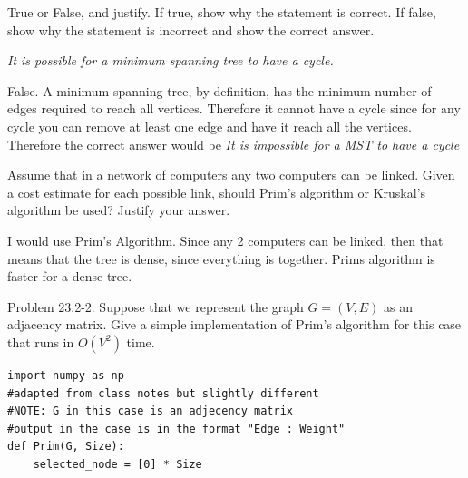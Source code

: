 \documentclass[addpoints,11pt]{exam}
\begin{document}
\begin{questions}
\ifprintanswers
\newpage
\else
\bigskip
\fi
	
	
\question[5]  True or False, and justify.  If true, show why the statement is correct.  If false, show why the statement is incorrect and show the correct answer.
\begin{center}
	\textit{It is possible for a minimum spanning tree to have a cycle.}
\end{center}
\begin{solutionorbox}
	False. A minimum spanning tree, by definition, has the minimum number of edges required to reach all vertices. Therefore it cannot have a cycle since for any cycle you can remove at least one edge and have it reach all the vertices. Therefore the correct answer would be \emph{It is impossible for a MST to have a cycle}
\end{solutionorbox}

\ifprintanswers
\newpage
\else
\bigskip
\fi


\question [5] Assume that in a network of computers any two computers can be linked.  Given a cost estimate for each possible link, should Prim's algorithm or Kruskal's algorithm be used?  Justify your answer.
\begin{solutionorbox}
    I would use Prim's Algorithm. Since any 2 computers can be linked, then that means that the tree is dense, since everything is together. Prims algorithm is faster for a dense tree. 
\end{solutionorbox}

\ifprintanswers
\newpage
\else
\bigskip
\fi


\question [10] Problem 23.2-2.  Suppose that we represent the graph $G=(V,E)$ as an adjacency matrix.  Give a simple implementation of Prim's algorithm for this case that runs in $O(V^2)$ time.
\begin{solutionorbox}
	    \begin{verbatim}
import numpy as np
#adapted from class notes but slightly different
#NOTE: G in this case is an adjecency matrix
#output in the case is in the format "Edge : Weight" 
def Prim(G, Size):
    selected_node = [0] * Size


\end{verbatim}
\end{solutionorbox}
\end{questions}
\end{document}
